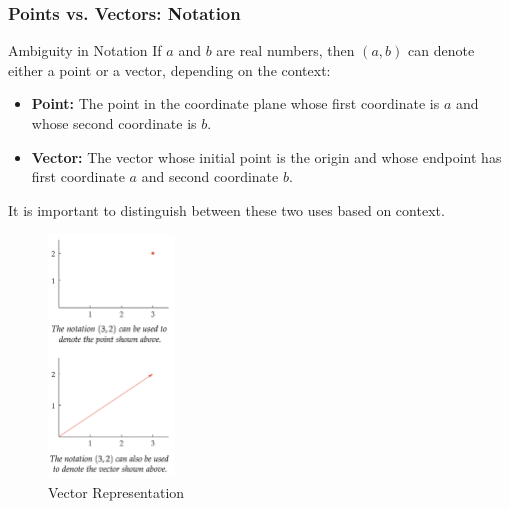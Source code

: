 \documentclass{beamer}
\begin{document}
\begin{frame}
    \frametitle{Points vs. Vectors: Notation}
    \begin{block}{Ambiguity in Notation}
        If \(a\) and \(b\) are real numbers, then \((a, b)\) can denote either a point or a vector, depending on the context:
        \begin{itemize}
            \item \textbf{Point:} The point in the coordinate plane whose first coordinate is \(a\) and whose second coordinate is \(b\).
            \item \textbf{Vector:} The vector whose initial point is the origin and whose endpoint has first coordinate \(a\) and second coordinate \(b\).
        \end{itemize}
        It is important to distinguish between these two uses based on context.
    \end{block}
\end{frame}

\begin{frame}
    \begin{figure}
        \centering
        \includegraphics[width=0.3\textwidth]{vector1.png}
        \caption{Vector Representation}
        \label{fig:vector_representation}
    \end{figure}
\end{frame}
\end{document}
